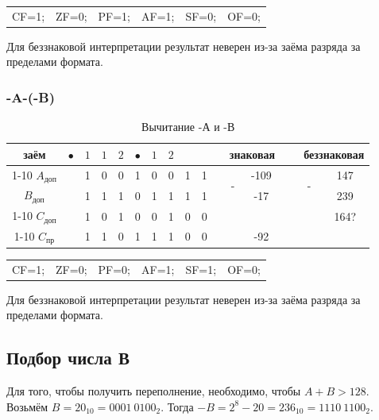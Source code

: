 \begin{table}[H]
    \centering
    \begin{tabular}{cccccc}
        CF=1; & ZF=0; & PF=1; & AF=1; & SF=0; & OF=0;
    \end{tabular}
\end{table}

Для беззнаковой интерпретации результат неверен из-за заёма разряда за пределами формата.

\subsubsection{-A-(-B)}

\begin{table}[H]
    \centering
    \caption{Вычитание -А и -В}
    \begin{tabular}{c|cc|cccccccp{1cm}ccp{0.5cm}cc}
		\small заём & $\bullet$ & $1$ & $1$ & $2$ & $\bullet$ & $1$ & $2$ & & & & \multicolumn{2}{c}{знаковая} & \  & \multicolumn{2}{c}{беззнаковая}  \\
		\cline{1-10} \cline{12-13} \cline{15-16}
		$A_{\text{доп}}$ & & 1 & 0 & 0 & 1 & 0 & 0 & 1 & 1 & & \multirow{2}{*}{-} & -109 & \  & \multirow{2}{*}{-} & 147\\
		$B_{\text{доп}}$ & & 1 & 1 & 1 & 0 & 1 & 1 & 1 & 1 & & & -17 & \  &  & 239 \\
		\cline{1-10} \cline{12-13} \cline{15-16}
		$C_{\text{доп}}$ & & 1 & 0 & 1 & 0 & 0 & 1 & 0 & 0 & & & & \  &  & 164? \\
		\cline{1-10} \cline{12-13} \cline{15-16}
		$C_{\text{пр}}$ & & 1 & 1 & 0 & 1 & 1 & 1 & 0 & 0 & & & -92 & \  &  & \\
    \end{tabular}
\end{table}

\begin{table}[H]
    \centering
    \begin{tabular}{cccccc}
        CF=1; & ZF=0; & PF=0; & AF=1; & SF=1; & OF=0;
    \end{tabular}
\end{table}

Для беззнаковой интерпретации результат неверен из-за заёма разряда за пределами формата.

\subsection{Подбор числа В}
Для того, чтобы получить переполнение, необходимо, чтобы $A+B>128$. Возьмём
$B=20_{10}=0001\ 0100_{2}$. Тогда $-B=2^8-20=236_{10}=1110\ 1100_{2}$.

